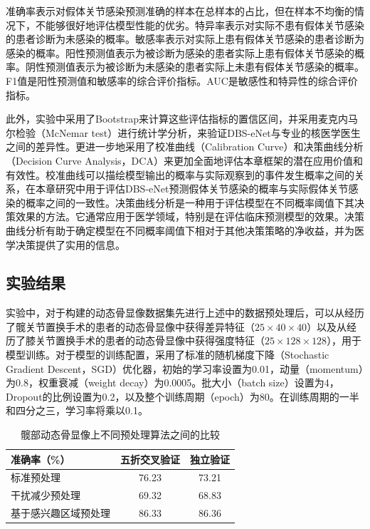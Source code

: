 准确率表示对假体关节感染预测准确的样本在总样本的占比，但在样本不均衡的情况下，不能够很好地评估模型性能的优劣。特异率表示对实际不患有假体关节感染的患者诊断为未感染的概率。敏感率表示对实际上患有假体关节感染的患者诊断为感染的概率。阳性预测值表示为被诊断为感染的患者实际上患有假体关节感染的概率。阴性预测值表示为被诊断为未感染的患者实际上未患有假体关节感染的概率。F1值是阳性预测值和敏感率的综合评价指标。AUC是敏感性和特异性的综合评价指标。

此外，实验中采用了Bootstrap\cite{hesterberg2011bootstrap}来计算这些评估指标的置信区间，并采用麦克内马尔检验（McNemar test）\cite{lachenbruch2014mcnemar}进行统计学分析，来验证DBS-eNet与专业的核医学医生之间的差异性。更进一步地采用了校准曲线（Calibration Curve）和决策曲线分析（Decision Curve Analysis，DCA）\cite{vickers2006decision}来更加全面地评估本章框架的潜在应用价值和有效性。校准曲线可以描绘模型输出的概率与实际观察到的事件发生概率之间的关系，在本章研究中用于评估DBS-eNet预测假体关节感染的概率与实际假体关节感染的概率之间的一致性。决策曲线分析是一种用于评估模型在不同概率阈值下其决策效果的方法。它通常应用于医学领域，特别是在评估临床预测模型的效果。决策曲线分析有助于确定模型在不同概率阈值下相对于其他决策策略的净收益，并为医学决策提供了实用的信息。

\subsection{实验结果}

实验中，对于构建的动态骨显像数据集先进行上述中的数据预处理后，可以从经历了髋关节置换手术的患者的动态骨显像中获得差异特征（\(25\times40\times40\)）以及从经历了膝关节置换手术的患者的动态骨显像中获得强度特征（\(25\times128\times128\)），用于模型训练。对于模型的训练配置，采用了标准的随机梯度下降（Stochastic Gradient Descent，SGD）优化器，初始的学习率设置为0.01，动量（momentum）为0.8，权重衰减（weight decay）为0.0005。批大小（batch size）设置为4，Dropout的比例设置为0.2，以及整个训练周期（epoch）为80。在训练周期的一半和四分之三，学习率将乘以0.1。

\begin{table}[htbp]
  \centering
  \caption{髋部动态骨显像上不同预处理算法之间的比较}
  \begin{tabular}{lcc}
    \toprule
    准确率（\%）         & 五折交叉验证 & 独立验证 \\
    \midrule
    标准预处理           & 76.23        & 73.21    \\
    干扰减少预处理       & 69.32        & 68.83    \\
    基于感兴趣区域预处理 & 86.33        & 86.36    \\
    \bottomrule
  \end{tabular}
  \label{tab:chap03_experiment_pre}
\end{table}

